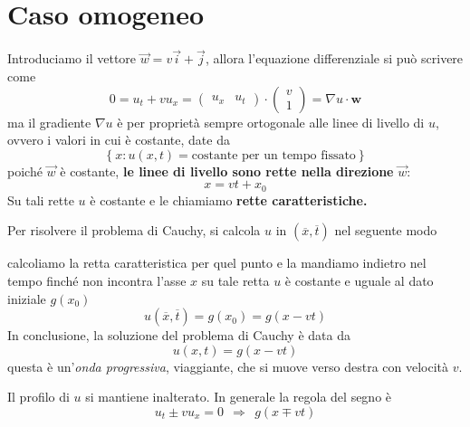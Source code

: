 \documentclass[10pt,a4paper,twoside,openright]{book}
\begin{document}
\section{Caso omogeneo}

Introduciamo il vettore $\vec{w} =v\vec{i} +\vec{j}$, allora l'equazione differenziale si può scrivere come
\begin{equation*}
	0=u_{t} +vu_{x} =\begin{pmatrix}
	u_{x} & u_{t}
	\end{pmatrix} \cdotp \begin{pmatrix}
	v\\
	1
	\end{pmatrix} =\nabla u\cdotp \mathbf{w}
\end{equation*}
ma il gradiente $\nabla u$ è per proprietà sempre ortogonale alle linee di livello di $u$, ovvero i valori in cui è costante, date da
\begin{equation*}
	\left\{x:u( x,t) =\text{costante per un tempo fissato}\right\}
\end{equation*}
poiché $\vec{w}$ è costante, \textbf{le linee di livello sono rette nella direzione} $\vec{w}$:
\begin{equation}
	x=vt+x_{0}
\end{equation}
Su tali rette $u$ è costante e le chiamiamo \textbf{rette caratteristiche.}

Per risolvere il problema di Cauchy, si calcola $u$ in $(\overline{x} ,\overline{t})$ nel seguente modo


calcoliamo la retta caratteristica per quel punto e la mandiamo indietro nel tempo finché non incontra l'asse $x$ su tale retta $u$ è costante e uguale al dato iniziale $g( x_{0})$
\begin{equation*}
	u(\overline{x} ,\overline{t}) =g( x_{0}) =g( x-vt)
\end{equation*}
In conclusione, la soluzione del problema di Cauchy è data da
\begin{equation}
	u( x,t) =g( x-vt)
\end{equation}
questa è un'\textit{onda progressiva}, viaggiante, che si muove verso destra con velocità $v$.


Il profilo di $u$ si mantiene inalterato. In generale la regola del segno è
\begin{equation*}
	u_{t} \pm vu_{x} =0\ \ \Rightarrow \ \ g( x\mp vt)
\end{equation*}
\end{document}

